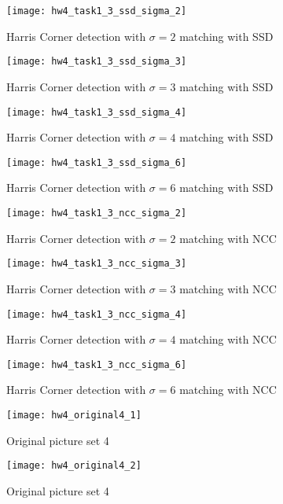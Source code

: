 \documentclass[11pt]{article}
\begin{document}
\begin{figure}[H]
\centering
\texttt{[image: hw4\_task1\_3\_ssd\_sigma\_2]}
\caption{Harris Corner detection with $\sigma = 2$ matching with SSD}
\label{}
\end{figure}
\begin{figure}[H]
\centering
\texttt{[image: hw4\_task1\_3\_ssd\_sigma\_3]}
\caption{Harris Corner detection with $\sigma = 3$ matching with SSD}
\label{}
\end{figure}
\begin{figure}[H]
\centering
\texttt{[image: hw4\_task1\_3\_ssd\_sigma\_4]}
\caption{Harris Corner detection with $\sigma = 4$ matching with SSD}
\label{}
\end{figure}
\begin{figure}[H]
\centering
\texttt{[image: hw4\_task1\_3\_ssd\_sigma\_6]}
\caption{Harris Corner detection with $\sigma = 6$ matching with SSD}
\label{}
\end{figure}

\begin{figure}[H]
\centering
\texttt{[image: hw4\_task1\_3\_ncc\_sigma\_2]}
\caption{Harris Corner detection with $\sigma = 2$ matching with NCC}
\label{}
\end{figure}
\begin{figure}[H]
\centering
\texttt{[image: hw4\_task1\_3\_ncc\_sigma\_3]}
\caption{Harris Corner detection with $\sigma = 3$ matching with NCC}
\label{}
\end{figure}
\begin{figure}[H]
\centering
\texttt{[image: hw4\_task1\_3\_ncc\_sigma\_4]}
\caption{Harris Corner detection with $\sigma = 4$ matching with NCC}
\label{}
\end{figure}
\begin{figure}[H]
\centering
\texttt{[image: hw4\_task1\_3\_ncc\_sigma\_6]}
\caption{Harris Corner detection with $\sigma = 6$ matching with NCC}
\label{}
\end{figure}



\begin{figure}[H]
\centering
\texttt{[image: hw4\_original4\_1]}
\caption{Original picture set 4}
\label{}
\end{figure}
\begin{figure}[H]
\centering
\texttt{[image: hw4\_original4\_2]}
\caption{Original picture set 4}
\label{}
\end{figure}
\end{document}
